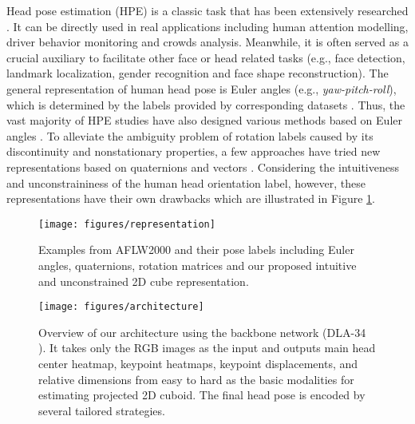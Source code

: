 \documentclass{article}
\begin{document}
Head pose estimation (HPE) is a classic task that has been extensively researched \cite{murphy2008head, ranjan2017hyperface, yu2018headfusion}. It can be directly used in real applications including human attention modelling, driver behavior monitoring and crowds analysis. Meanwhile, it is often served as a crucial auxiliary to facilitate other face or head related tasks (e.g., face detection, landmark localization, gender recognition and face shape reconstruction). The general representation of human head pose is Euler angles (e.g., {\it yaw-pitch-roll}), which is determined by the labels provided by corresponding datasets \cite{fanelli2013random, zhu2016face}. Thus, the vast majority of HPE studies have also designed various methods based on Euler angles \cite{ruiz2018fine, yang2019fsa, zhou2020whenet}. To alleviate the ambiguity problem of rotation labels caused by its discontinuity and nonstationary properties, a few approaches have tried new representations based on quaternions \cite{hsu2018quatnet} and vectors \cite{cao2021vector, hempel20226d}. Considering the intuitiveness and unconstraininess of the human head orientation label, however, these representations have their own drawbacks which are illustrated in Figure \ref{representation}. 

\begin{figure}[!t]
	\centering
	\texttt{[image: figures/representation]}
	\caption{Examples from AFLW2000 \cite{zhu2016face} and their pose labels including Euler angles, quaternions, rotation matrices and our proposed intuitive and unconstrained 2D cube representation.}
	\label{representation}
\end{figure}


\begin{figure*}[!t]
	\centering
	\texttt{[image: figures/architecture]}
	\caption{Overview of our architecture using the backbone network (DLA-34 \cite{yu2018deep}). It takes only the RGB images as the input and outputs main head center heatmap, keypoint heatmaps, keypoint displacements, and relative dimensions from easy to hard as the basic modalities for estimating projected 2D cuboid. The final head pose is encoded by several tailored strategies.}
	\label{architecture}
\end{figure*}
\end{document}
